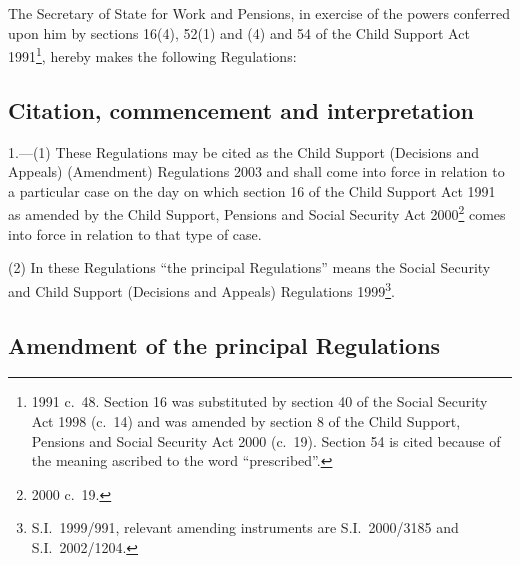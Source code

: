 \documentclass[12pt,a4paper]{article}
\title{\regstitle}
\author{S.I.\ 2003 No.\ 129}
\date{Made
27th January 2003\\
Laid before Parliament
31st January 2003\\
Coming into force
in accordance with regulation 1(1)
}
\begin{document}
\maketitle

\noindent
The Secretary of State for Work and Pensions, in exercise of the powers conferred upon him by sections 16(4), 52(1) and (4) and 54 of the Child Support Act 1991\footnote{1991 c.\ 48. Section 16 was substituted by section 40 of the Social Security Act 1998 (c.\ 14) and was amended by section 8 of the Child Support, Pensions and Social Security Act 2000 (c.\ 19). Section 54 is cited because of the meaning ascribed to the word “prescribed”.}, hereby makes the following Regulations: 

{\sloppy

\tableofcontents

}

\bigskip

\setcounter{secnumdepth}{-2}

\subsection[1. Citation, commencement and interpretation]{Citation, commencement and interpretation}

1.---(1)  These Regulations may be cited as the Child Support (Decisions and Appeals) (Amendment) Regulations 2003 and shall come into force in relation to a particular case on the day on which section 16 of the Child Support Act 1991 as amended by the Child Support, Pensions and Social Security Act 2000\footnote{2000 c.\ 19.} comes into force in relation to that type of case.

(2) In these Regulations “the principal Regulations” means the Social Security and Child Support (Decisions and Appeals) Regulations 1999\footnote{S.I.\ 1999/991, relevant amending instruments are S.I.\ 2000/3185 and S.I.\ 2002/1204.}.

\subsection[2. Amendment of the principal Regulations]{Amendment of the principal Regulations}
\end{document}
